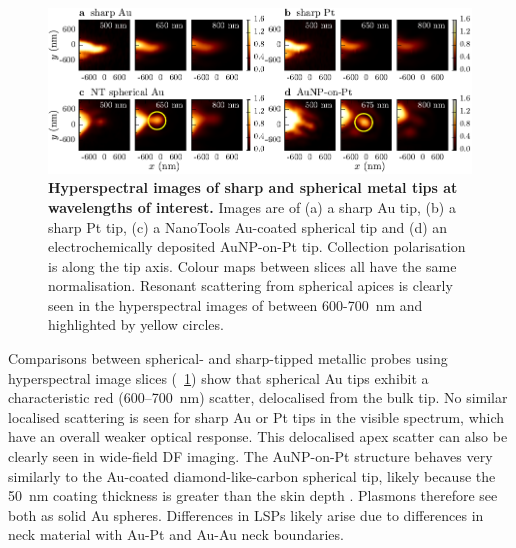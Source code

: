 \documentclass{article}
\begin{document}
\begin{figure}[bt]
\centering
\includegraphics{figures/hyperspectral_tip_comparison}
\caption[Hyperspectral images of sharp and spherical metal tips at wavelengths of interest]{\textbf{Hyperspectral images of sharp and spherical metal tips at wavelengths of interest.} Images are of (a) a sharp Au tip, (b) a sharp Pt tip, (c) a NanoTools Au-coated spherical tip and (d) an electrochemically deposited AuNP-on-Pt tip. Collection polarisation is along the tip axis. Colour maps between slices all have the same normalisation. Resonant scattering from spherical apices is clearly seen in the hyperspectral images of between 600-\SI{700}{nm} and highlighted by yellow circles.}
\label{fig:hyperspectral_tip_comparison}
\vspace{-5pt}
\end{figure}

Comparisons between spherical- and sharp-tipped metallic probes using hyperspectral image slices (\figurename~\ref{fig:hyperspectral_tip_comparison}) show that spherical Au tips exhibit a characteristic red (600--\SI{700}{nm}) scatter, delocalised from the bulk tip. No similar localised scattering is seen for sharp Au or Pt tips in the visible spectrum, which have an overall weaker optical response. This delocalised apex scatter can also be clearly seen in wide-field DF imaging.
The AuNP-on-Pt structure behaves very similarly to the Au-coated diamond-like-carbon spherical tip, likely because the \SI{50}{nm} coating thickness is greater than the skin depth \cite{stockman2011, huber2014}. Plasmons therefore see both as solid Au spheres. Differences in LSPs likely arise due to differences in neck material with Au-Pt and Au-Au neck boundaries.
\end{document}
